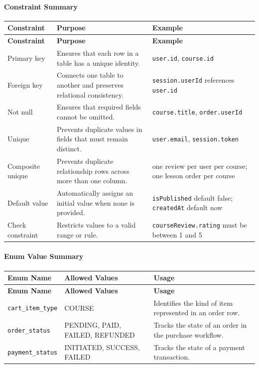 \paragraph{Constraint Summary}
\begin{longtable}{L{3cm}L{6.8cm}L{3.9cm}}
\toprule
\textbf{Constraint} & \textbf{Purpose} & \textbf{Example} \\
\midrule
\endfirsthead
\toprule
\textbf{Constraint} & \textbf{Purpose} & \textbf{Example} \\
\midrule
\endhead
\bottomrule
\endfoot
Primary key & Ensures that each row in a table has a unique identity. & \texttt{user.id}, \texttt{course.id} \\
Foreign key & Connects one table to another and preserves relational consistency. & \texttt{session.userId} references \texttt{user.id} \\
Not null & Ensures that required fields cannot be omitted. & \texttt{course.title}, \texttt{order.userId} \\
Unique & Prevents duplicate values in fields that must remain distinct. & \texttt{user.email}, \texttt{session.token} \\
Composite unique & Prevents duplicate relationship rows across more than one column. & one review per user per course; one lesson order per course \\
Default value & Automatically assigns an initial value when none is provided. & \texttt{isPublished} default false; \texttt{createdAt} default now \\
Check constraint & Restricts values to a valid range or rule. & \texttt{courseReview.rating} must be between 1 and 5 \\
\end{longtable}

\paragraph{Enum Value Summary}
\begin{longtable}{L{3.3cm}L{5.8cm}L{4.6cm}}
\toprule
\textbf{Enum Name} & \textbf{Allowed Values} & \textbf{Usage} \\
\midrule
\endfirsthead
\toprule
\textbf{Enum Name} & \textbf{Allowed Values} & \textbf{Usage} \\
\midrule
\endhead
\bottomrule
\endfoot
\texttt{cart\_item\_type} & COURSE & Identifies the kind of item represented in an order row. \\
\texttt{order\_status} & PENDING, PAID, FAILED, REFUNDED & Tracks the state of an order in the purchase workflow. \\
\texttt{payment\_status} & INITIATED, SUCCESS, FAILED & Tracks the state of a payment transaction. \\
\end{longtable}
\endgroup

